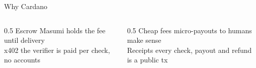 \begin{frame}{Why Cardano}
  \begin{columns}[T]
    \begin{column}{0.5\textwidth}
      \alert{Escrow} Masumi holds the fee until delivery\\[0.6em]
      \alert{x402} the verifier is paid per check, no accounts
    \end{column}
    \begin{column}{0.5\textwidth}
      \alert{Cheap fees} micro-payouts to humans make sense\\[0.6em]
      \alert{Receipts} every check, payout and refund is a public tx
    \end{column}
  \end{columns}
\end{frame}
